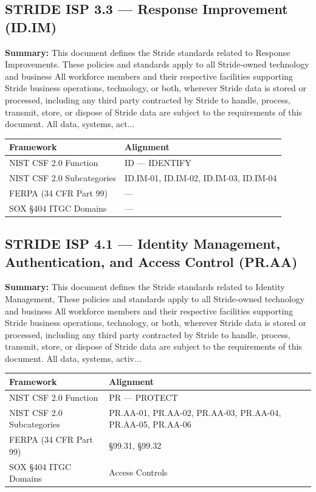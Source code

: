 \documentclass[11pt,landscape]{article}
\begin{document}
\subsection{\textcolor{strideblue}{STRIDE ISP 3.3} --- Response Improvement (ID.IM)}
\label{pol:ISP33}

\textbf{Summary:} This document defines the Stride standards related to Response Improvements. These policies and standards apply to all Stride-owned technology and business All workforce members and their respective facilities supporting Stride business operations, technology, or both, wherever Stride data is stored or processed, including any third party contracted by Stride to handle, process, transmit, store, or dispose of Stride data are subject to the requirements of this document. All data, systems, act...

\begin{tabularx}{\textwidth}{|p{4cm}|X|}
\hline
\rowcolor{headgray} \textbf{Framework} & \textbf{Alignment} \\
\hline
NIST CSF 2.0 Function & ID --- IDENTIFY \\
\hline
NIST CSF 2.0 Subcategories & ID.IM-01, ID.IM-02, ID.IM-03, ID.IM-04 \\
\hline
FERPA (34 CFR Part 99) & --- \\
\hline
SOX §404 ITGC Domains & --- \\
\hline
\end{tabularx}


\subsection{\textcolor{strideblue}{STRIDE ISP 4.1} --- Identity Management, Authentication, and Access Control (PR.AA)}
\label{pol:ISP41}

\textbf{Summary:} This document defines the Stride standards related to Identity Management, These policies and standards apply to all Stride-owned technology and business All workforce members and their respective facilities supporting Stride business operations, technology, or both, wherever Stride data is stored or processed, including any third party contracted by Stride to handle, process, transmit, store, or dispose of Stride data are subject to the requirements of this document. All data, systems, activ...

\begin{tabularx}{\textwidth}{|p{4cm}|X|}
\hline
\rowcolor{headgray} \textbf{Framework} & \textbf{Alignment} \\
\hline
NIST CSF 2.0 Function & PR --- PROTECT \\
\hline
NIST CSF 2.0 Subcategories & PR.AA-01, PR.AA-02, PR.AA-03, PR.AA-04, PR.AA-05, PR.AA-06 \\
\hline
FERPA (34 CFR Part 99) & §99.31, §99.32 \\
\hline
SOX §404 ITGC Domains & Access Controls \\
\hline
\end{tabularx}
\end{document}
